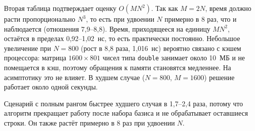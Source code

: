 Вторая таблица подтверждает оценку $O(MN^2)$. Так как $M = 2N$, время должно расти
пропорционально $N^3$, то есть при удвоении $N$ примерно в 8 раз, что и наблюдается
(отношения 7{,}9--8{,}8). Время, приходящееся на единицу $MN^2$, остаётся в пределах
0{,}92--1{,}02~нс, то есть практически постоянно. Небольшое увеличение при $N = 800$
(рост в 8{,}8 раза, 1{,}016~нс) вероятно связано с кэшем процессора: матрица $1600 \times 801$ чисел
типа \texttt{double} занимает около 10~МБ и не помещается в кэш, поэтому обращения к памяти
становятся медленнее. На асимптотику это не влияет. В худшем случае ($N = 800$, $M = 1600$)
решение работает около одной секунды.

Сценарий с полным рангом быстрее худшего случая в 1{,}7--2{,}4 раза, потому что алгоритм
прекращает работу после набора базиса и не обрабатывает оставшиеся строки. Он также
растёт примерно в 8 раз при удвоении $N$.

\pagebreak